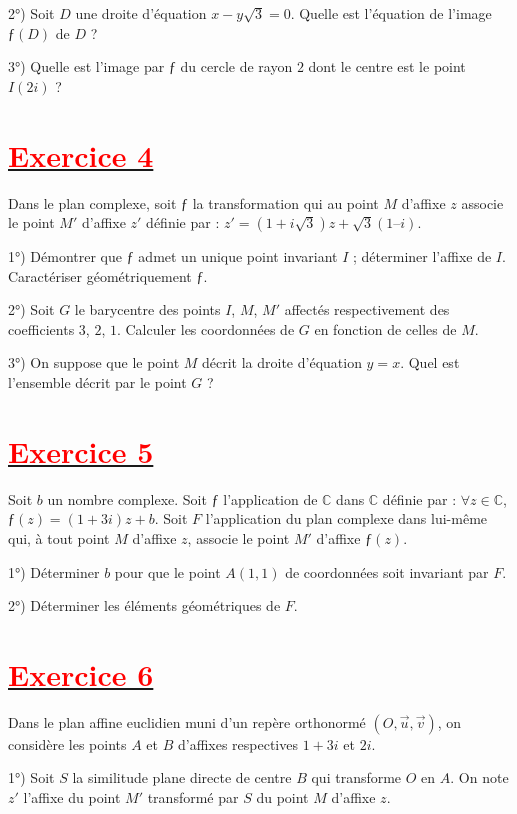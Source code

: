 \documentclass[12pt]{article}
\begin{document}
2°) Soit $D$ une droite d’équation $x - y\sqrt{3} = 0$. Quelle est l’équation de l’image $ƒ(D)$ de $D$ ?

3°) Quelle est l’image par $ƒ$ du cercle de rayon $2$ dont le centre est le point $I(2i)$ ?

\section*{\underline{\textbf{\textcolor{red}{Exercice 4}}}}

Dans le plan complexe, soit $ƒ$ la transformation qui au point $M$ d’affixe $z$ associe le point $M'$ d’affixe $z'$ définie par : $z' = (1 + i\sqrt{3})z +\sqrt{3}(1 – i)$.

1°) Démontrer que $ƒ$ admet un unique point invariant $I$ ; déterminer l’affixe de $I$. Caractériser géométriquement $ƒ$.

2°) Soit $G$ le barycentre des points $I$, $M$, $M'$ affectés respectivement des coefficients $3$, $2$, $1$. Calculer les coordonnées de $G$ en fonction de celles de $M$.

3°) On suppose que le point $M$ décrit la droite d’équation $y = x$. Quel est l’ensemble décrit par le point $G$ ?

\section*{\underline{\textbf{\textcolor{red}{Exercice 5}}}}

Soit $b$ un nombre complexe. Soit $ƒ$ l’application de $\mathbb{C}$ dans $\mathbb{C}$ définie par : $\forall z \in \mathbb{C}$, $ƒ(z) = (1 + 3i)z + b$. Soit $F$ l’application du plan complexe dans lui-même qui, à tout point $M$ d’affixe $z$, associe le point $M'$ d’affixe $ƒ(z)$.

1°) Déterminer $b$ pour que le point $A(1, 1)$ de coordonnées soit invariant par $F$.

2°) Déterminer les éléments géométriques de $F$.

\section*{\underline{\textbf{\textcolor{red}{Exercice 6}}}}

Dans le plan affine euclidien muni d’un repère orthonormé $(O, \vec{u}, \vec{v})$, on considère les points $A$ et $B$ d’affixes respectives $1 + 3i$ et $2i$.

1°) Soit $S$ la similitude plane directe de centre $B$ qui transforme $O$ en $A$. On note $z'$ l’affixe du point $M'$ transformé par $S$ du point $M$ d’affixe $z$.
\end{document}
